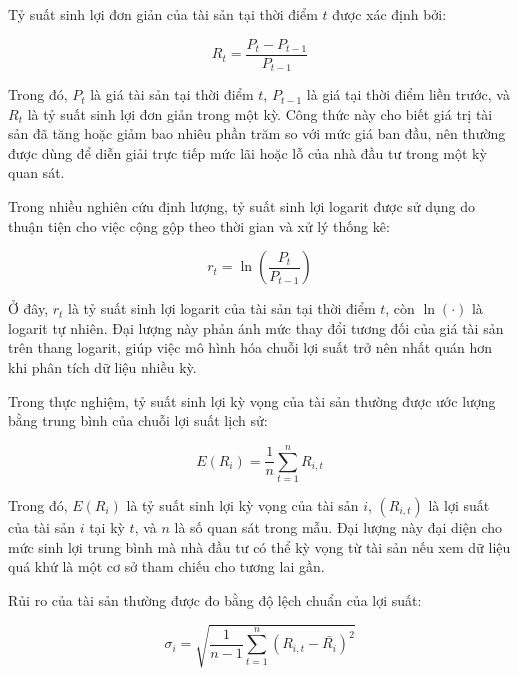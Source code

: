 \documentclass[12pt,a4paper,openany,oneside]{book}
\begin{document}
Tỷ suất sinh lợi đơn giản của tài sản tại thời điểm \(t\) được xác định bởi:

\begin{equation}\label{eq:theory-01}
{R}_{t}=\frac{{P}_{t}-{P}_{t-1}}{{P}_{t-1}}
\end{equation}

Trong đó, \({P}_{t}\) là giá tài sản tại thời điểm \(t\), \({P}_{t-1}\) là giá tại thời điểm liền trước, và \({R}_{t}\) là tỷ suất sinh lợi đơn giản trong một kỳ. Công thức này cho biết giá trị tài sản đã tăng hoặc giảm bao nhiêu phần trăm so với mức giá ban đầu, nên thường được dùng để diễn giải trực tiếp mức lãi hoặc lỗ của nhà đầu tư trong một kỳ quan sát.

Trong nhiều nghiên cứu định lượng, tỷ suất sinh lợi logarit được sử dụng do thuận tiện cho việc cộng gộp theo thời gian và xử lý thống kê:

\begin{equation}\label{eq:theory-02}
{r}_{t}=\operatorname{ln}\left(\frac{{P}_{t}}{{P}_{t-1}}\right)
\end{equation}

Ở đây, \({r}_{t}\) là tỷ suất sinh lợi logarit của tài sản tại thời điểm \(t\), còn \(\operatorname{ln}\left(\cdot\right)\) là logarit tự nhiên. Đại lượng này phản ánh mức thay đổi tương đối của giá tài sản trên thang logarit, giúp việc mô hình hóa chuỗi lợi suất trở nên nhất quán hơn khi phân tích dữ liệu nhiều kỳ.

Trong thực nghiệm, tỷ suất sinh lợi kỳ vọng của tài sản thường được ước lượng bằng trung bình của chuỗi lợi suất lịch sử:

\begin{equation}\label{eq:theory-03}
E\left({R}_{i}\right)=\frac{1}{n}\sum_{t=1}^{n}{{R}_{i,t}}
\end{equation}

Trong đó, \(E\left({R}_{i}\right)\) là tỷ suất sinh lợi kỳ vọng của tài sản \(i\), \(\left({R}_{i,t}\right)\) là lợi suất của tài sản \(i\) tại kỳ \(t\), và \(n\) là số quan sát trong mẫu. Đại lượng này đại diện cho mức sinh lợi trung bình mà nhà đầu tư có thể kỳ vọng từ tài sản nếu xem dữ liệu quá khứ là một cơ sở tham chiếu cho tương lai gần.

Rủi ro của tài sản thường được đo bằng độ lệch chuẩn của lợi suất:

\begin{equation}\label{eq:theory-04}
{\sigma}_{i}=\sqrt{\frac{1}{n-1}\sum_{t=1}^{n}{{\left({R}_{i,t}-\bar{{R}_{i}}\right)}^{2}}}
\end{equation}
\end{document}
